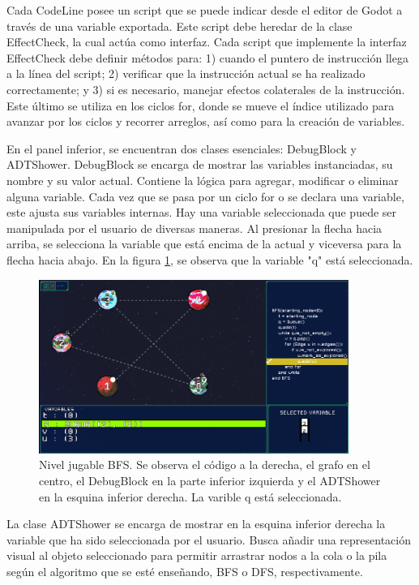 Cada CodeLine posee un script que se puede indicar desde el editor de Godot a través de una variable exportada. Este script debe heredar de la clase EffectCheck, la cual actúa como interfaz. Cada script que implemente la interfaz EffectCheck debe definir métodos para: 1) cuando el puntero de instrucción llega a la línea del script; 2) verificar que la instrucción actual se ha realizado correctamente; y 3) si es necesario, manejar efectos colaterales de la instrucción. Este último se utiliza en los ciclos for, donde se mueve el índice utilizado para avanzar por los ciclos y recorrer arreglos, así como para la creación de variables.

En el panel inferior, se encuentran dos clases esenciales: DebugBlock y ADTShower. DebugBlock se encarga de mostrar las variables instanciadas, su nombre y su valor actual. Contiene la lógica para agregar, modificar o eliminar alguna variable. Cada vez que se pasa por un ciclo for o se declara una variable, este ajusta sus variables internas. Hay una variable seleccionada que puede ser manipulada por el usuario de diversas maneras. Al presionar la flecha hacia arriba, se selecciona la variable que está encima de la actual y viceversa para la flecha hacia abajo. En la figura \ref{BFSFullGame}, se observa que la variable "q" está seleccionada.

\begin{figure}[h]
	\centering
	\includegraphics[width=0.9\textwidth]{imagenes/BFSFullGame.png}
	\caption{Nivel jugable BFS. Se observa el código a la derecha, el grafo en el centro, el DebugBlock en la parte inferior izquierda y el ADTShower en la esquina inferior derecha. La varible q está seleccionada.}
	\label{BFSFullGame}
\end{figure}

La clase ADTShower se encarga de mostrar en la esquina inferior derecha la variable que ha sido seleccionada por el usuario. Busca añadir una representación visual al objeto seleccionado para permitir arrastrar nodos a la cola o la pila según el algoritmo que se esté enseñando, BFS o DFS, respectivamente.

